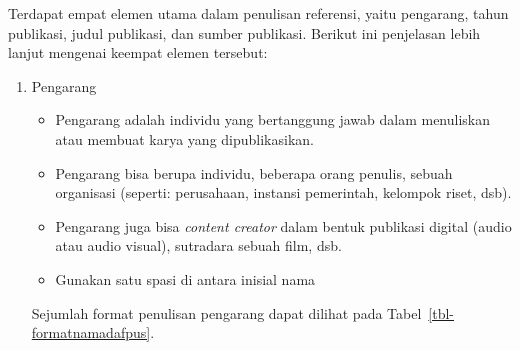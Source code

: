 \documentclass[
  indonesian,
  letterpaper,
]{scrbook}
\providecommand{\tightlist}{%
  \setlength{\itemsep}{0pt}\setlength{\parskip}{0pt}}
\begin{document}
Terdapat empat elemen utama dalam penulisan referensi, yaitu pengarang,
tahun publikasi, judul publikasi, dan sumber publikasi. Berikut ini
penjelasan lebih lanjut mengenai keempat elemen tersebut:

\begin{enumerate}
\def\labelenumi{\arabic{enumi}.}
\item
  Pengarang

  \begin{itemize}
  \tightlist
  \item
    Pengarang adalah individu yang bertanggung jawab dalam menuliskan
    atau membuat karya yang dipublikasikan.
  \item
    Pengarang bisa berupa individu, beberapa orang penulis, sebuah
    organisasi (seperti: perusahaan, instansi pemerintah, kelompok
    riset, dsb).
  \item
    Pengarang juga bisa \emph{content creator} dalam bentuk publikasi
    digital (audio atau audio visual), sutradara sebuah film, dsb.
  \item
    Gunakan satu spasi di antara inisial nama
  \end{itemize}

  Sejumlah format penulisan pengarang dapat dilihat pada
  Tabel~\ref{tbl-formatnamadafpus}.
\end{enumerate}
\end{document}
